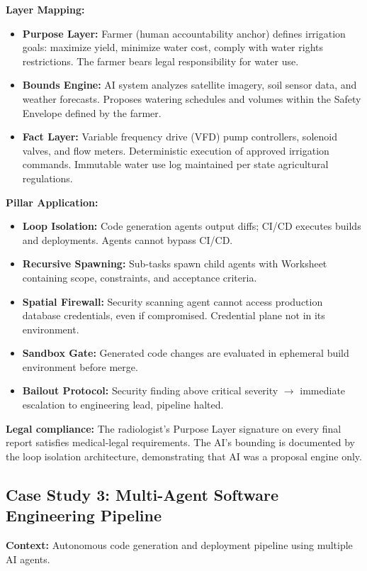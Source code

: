 \documentclass[12pt]{article}
\begin{document}
\textbf{Layer Mapping:}
\begin{itemize}
\item \textbf{Purpose Layer:} Farmer (human accountability anchor) defines irrigation goals: maximize yield, minimize water cost, comply with water rights restrictions. The farmer bears legal responsibility for water use.
\item \textbf{Bounds Engine:} AI system analyzes satellite imagery, soil sensor data, and weather forecasts. Proposes watering schedules and volumes within the Safety Envelope defined by the farmer.
\item \textbf{Fact Layer:} Variable frequency drive (VFD) pump controllers, solenoid valves, and flow meters. Deterministic execution of approved irrigation commands. Immutable water use log maintained per state agricultural regulations.
\end{itemize}

\textbf{Pillar Application:}
\begin{itemize}
\item \textbf{Loop Isolation:} Code generation agents output diffs; CI/CD executes builds and deployments. Agents cannot bypass CI/CD.
\item \textbf{Recursive Spawning:} Sub-tasks spawn child agents with Worksheet containing scope, constraints, and acceptance criteria.
\item \textbf{Spatial Firewall:} Security scanning agent cannot access production database credentials, even if compromised. Credential plane not in its environment.
\item \textbf{Sandbox Gate:} Generated code changes are evaluated in ephemeral build environment before merge.
\item \textbf{Bailout Protocol:} Security finding above critical severity $\rightarrow$ immediate escalation to engineering lead, pipeline halted.
\end{itemize}

\textbf{Legal compliance:} The radiologist's Purpose Layer signature on every final report satisfies medical-legal requirements. The AI's bounding is documented by the loop isolation architecture, demonstrating that AI was a proposal engine only.

\subsection{Case Study 3: Multi-Agent Software Engineering Pipeline}
\textbf{Context:} Autonomous code generation and deployment pipeline using multiple AI agents.
\end{document}
